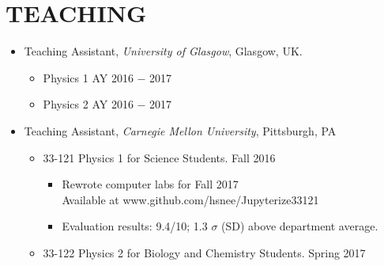 \section{TEACHING}
\renewcommand\labelitemii{$\square$}
\begin{itemize}
\item Teaching Assistant, {\sl University of Glasgow}, Glasgow, UK.
\begin{itemize}
\item Physics 1 \hfill AY 2016 $-$ 2017
\item Physics 2 \hfill AY 2016 $-$ 2017
\end{itemize}
\item Teaching Assistant, {\sl Carnegie Mellon University}, Pittsburgh, PA
	\begin{itemize}
	\item 33-121 Physics 1 for Science Students. \hfill Fall 2016
		\begin{itemize}
		\item Rewrote computer labs for Fall 2017 \\ Available at www.github.com/hsnee/Jupyterize33121
		\item Evaluation results: 9.4/10; 1.3 $\sigma$ (SD) above department average.
		\end{itemize}
	\item 33-122 Physics 2 for Biology and Chemistry Students. \hfill Spring 2017
	\end{itemize}
\end{itemize}
